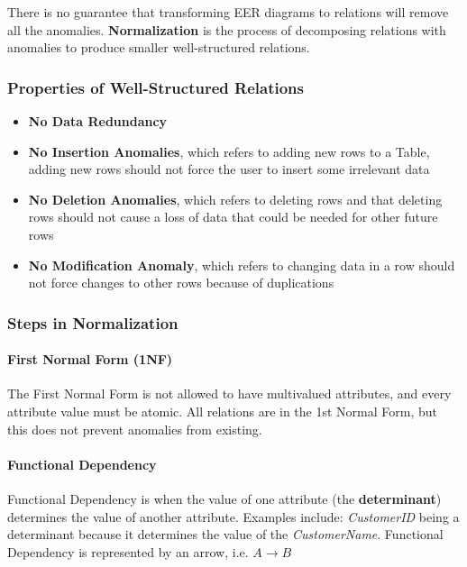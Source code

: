 \documentclass[12pt]{article}
\begin{document}
There is no guarantee that transforming EER diagrams to relations will remove all the anomalies. \textbf{Normalization} is the process of decomposing relations with anomalies to produce smaller well-structured relations.
\subsubsection{Properties of Well-Structured Relations}
\begin{itemize}
	\item{\textbf{No Data Redundancy}}
	\item{\textbf{No Insertion Anomalies}, which refers to adding new rows to a Table, adding new rows should not force the user to insert some irrelevant data}
	\item{\textbf{No Deletion Anomalies}, which refers to deleting rows and that deleting rows should not cause a loss of data that could be needed for other future rows}
	\item{\textbf{No Modification Anomaly}, which refers to changing data in a row should not force changes to other rows because of duplications}
\end{itemize}

\subsubsection{Steps in Normalization}

\paragraph{First Normal Form (1NF)} The First Normal Form is not allowed to have multivalued attributes, and every attribute value must be atomic. All relations are in the 1st Normal Form, but this does not prevent anomalies from existing.

\paragraph{Functional Dependency} Functional Dependency is when the value of one attribute (the \textbf{determinant}) determines the value of another attribute. Examples include: \textit{CustomerID} being a determinant because it determines the value of the \textit{CustomerName}. Functional Dependency is represented by an arrow, i.e. $A \rightarrow B$
\end{document}
